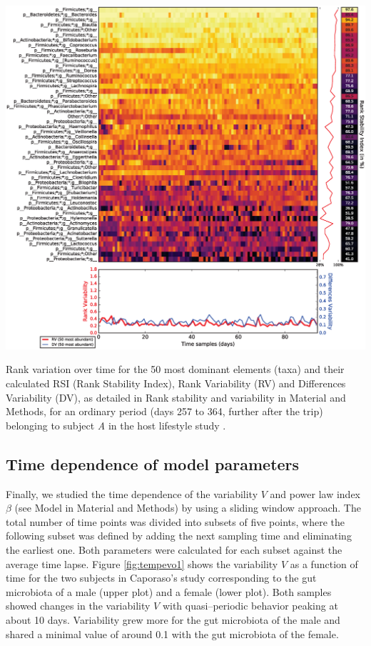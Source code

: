 \begin{supfig}
	\centering
	\includegraphics[width=1.0\textwidth]{figs/supfig_corrank_HLS_StoolA_after.eps}
	\caption{Rank variation over time for the 50 most dominant elements (taxa) and their calculated RSI (Rank Stability Index), Rank Variability (RV) and Differences Variability (DV), as detailed in Rank stability and variability in Material and Methods, for an ordinary period (days 257 to 364, further after the trip) belonging to subject \emph{A} in the host lifestyle study \cite{hostlife}.}
	\label{supfig:corrank_HLS_after}
\end{supfig}

\subsection*{Time dependence of model parameters}

Finally, we studied the time dependence of the variability $V$ and power law index $\beta$ (see Model in Material and Methods) by using a sliding window approach. The total number of time points was divided into subsets of five points, where the following subset was defined by adding the next sampling time and eliminating the earliest one. Both parameters were calculated for each subset against the average time lapse. Figure \ref{fig:tempevo1} shows the variability $V$ as a function of time for the two subjects in Caporaso's study\cite{moving} corresponding to the gut microbiota of a male (upper plot) and a female (lower plot). Both samples showed changes in the variability $V$ with quasi--periodic behavior peaking at about 10 days. Variability grew more for the gut microbiota of the male and shared a minimal value of around 0.1 with the gut microbiota of the female. 

